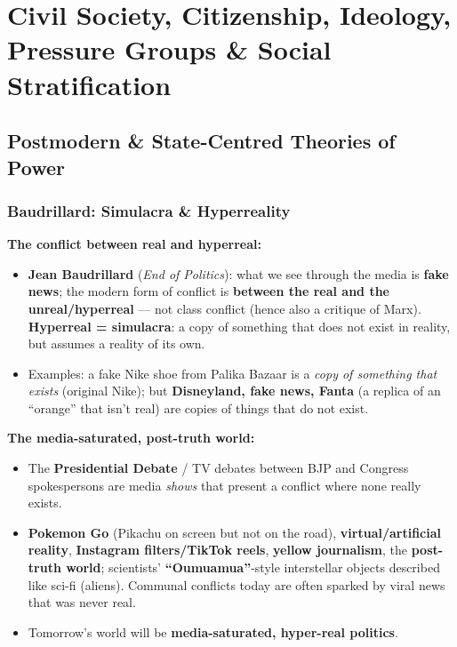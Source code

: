 \chapter{Civil Society, Citizenship, Ideology, Pressure Groups \& Social Stratification}

\section{Postmodern \& State-Centred Theories of Power}

\subsection{Baudrillard: Simulacra \& Hyperreality}

\begin{KeyConcept}
\textbf{The conflict between real and hyperreal:}
\begin{itemize}
\item \textbf{Jean Baudrillard} (\textit{End of Politics}): what we see through the media is \textbf{fake news}; the modern form of conflict is \textbf{between the real and the unreal/hyperreal} --- not class conflict (hence also a critique of Marx). \textbf{Hyperreal = simulacra}: a copy of something that does not exist in reality, but assumes a reality of its own.
\item Examples: a fake Nike shoe from Palika Bazaar is a \textit{copy of something that exists} (original Nike); but \textbf{Disneyland, fake news, Fanta} (a replica of an ``orange'' that isn't real) are copies of things that do not exist.
\end{itemize}
\end{KeyConcept}

\begin{ExampleBox}
\textbf{The media-saturated, post-truth world:}
\begin{itemize}
\item The \textbf{Presidential Debate} / TV debates between BJP and Congress spokespersons are media \textit{shows} that present a conflict where none really exists.
\item \textbf{Pokemon Go} (Pikachu on screen but not on the road), \textbf{virtual/artificial reality}, \textbf{Instagram filters/TikTok reels}, \textbf{yellow journalism}, the \textbf{post-truth world}; scientists' \textbf{``Oumuamua''}-style interstellar objects described like sci-fi (aliens). Communal conflicts today are often sparked by viral news that was never real.
\item Tomorrow's world will be \textbf{media-saturated, hyper-real politics}.
\end{itemize}
\end{ExampleBox}

